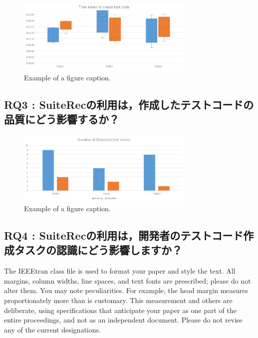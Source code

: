 \documentclass[conference]{IEEEtran}
\begin{document}
\begin{figure}[htbp]
\centerline{\includegraphics[width=8.5cm]{time.pdf}}
\caption{Example of a figure caption.}
\label{fig}
\end{figure}

\subsection{RQ3 : SuiteRecの利用は，作成したテストコードの品質にどう影響するか？}

\begin{figure}[htbp]
\centerline{\includegraphics[width=8.5cm]{testsmell.pdf}}
\caption{Example of a figure caption.}
\label{fig}
\end{figure}

\subsection{RQ4 : SuiteRecの利用は，開発者のテストコード作成タスクの認識にどう影響しますか？}





The IEEEtran class file is used to format your paper and style the text. All margins, 
column widths, line spaces, and text fonts are prescribed; please do not 
alter them. You may note peculiarities. For example, the head margin
measures proportionately more than is customary. This measurement 
and others are deliberate, using specifications that anticipate your paper 
as one part of the entire proceedings, and not as an independent document. 
Please do not revise any of the current designations.
\end{document}
